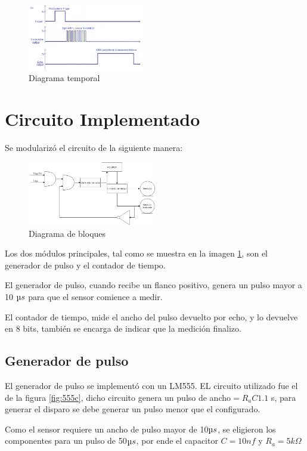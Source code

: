 \documentclass[../../e3_tp2_main.tex]{subfiles}
\begin{document}
\begin{figure}[H]	
	\centering
	\includegraphics[width=0.45\textwidth]{imagenes/sensor_t.png}
	\caption{Diagrama temporal}
\end{figure}

\section{Circuito Implementado}

Se modularizó el circuito de la siguiente manera:
\begin{figure}[H]	
	\centering
	\includegraphics[width=0.5\textwidth]{imagenes/dBloques.png}
	\caption{Diagrama de bloques}\label{fig:dBloques}
\end{figure}
Los dos módulos principales, tal como se muestra en la imagen \ref{fig:dBloques}, son el generador de pulso y el contador de tiempo.
\par El generador de pulso, cuando recibe un flanco positivo, genera un pulso mayor a 10 $\micro s$ para que el sensor comience a medir.
\par El contador de tiempo, mide el ancho del pulso devuelto por echo, y lo devuelve en 8 bits, también se encarga de indicar que la medición finalizo.

\subsection{Generador de pulso}
El generador de pulso se implementó con un LM555. EL circuito utilizado fue el de la figura \ref{fig:555c}, dicho circuito genera un pulso de ancho$= R_a C 1.1$ s, para generar el disparo se debe generar un pulso menor que el configurado.
\par Como el sensor requiere un ancho de pulso mayor de 10$\micro s$, se eligieron los componentes para un pulso de 50$\micro s$, por ende el capacitor $C=10nf$ y $R_a=5k \Omega$
\end{document}
